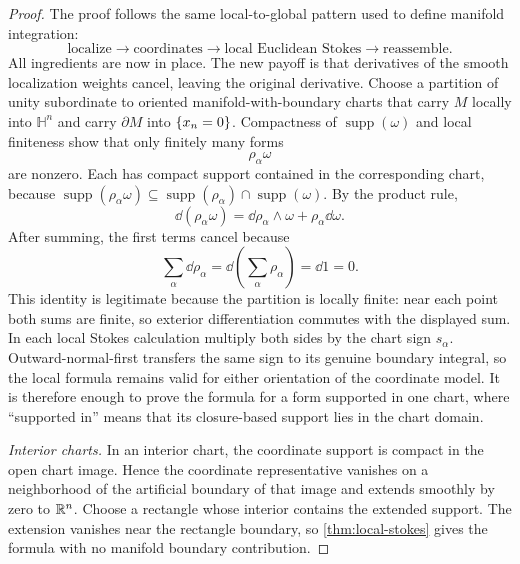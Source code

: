 \begin{proof}
The proof follows the same local-to-global pattern used to define
manifold integration:
\[
\text{localize}\to\text{coordinates}\to\text{local Euclidean Stokes}
\to\text{reassemble}.
\]
All ingredients are now in place. The new payoff is that derivatives of
the smooth localization weights cancel, leaving the original derivative.
Choose a partition of unity subordinate to oriented manifold-with-boundary
charts that carry $M$ locally into \(\mathbb H^n\) and carry
\(\partial M\) into \(\left\{x_n=0\right\}\).  Compactness of
\(\operatorname{supp}(\omega)\) and local finiteness
show that only finitely many forms
\[
\rho_\alpha\omega
\]
are nonzero.  Each has compact support contained in the corresponding chart,
because
\(\operatorname{supp}(\rho_\alpha\omega)\subseteq
\operatorname{supp}(\rho_\alpha)\cap\operatorname{supp}(\omega)\).
By the product rule,
\[
\dd(\rho_\alpha\omega)
=
\dd\rho_\alpha\wedge\omega+\rho_\alpha\dd\omega.
\]
After summing, the first terms cancel because
\[
\sum_\alpha\dd\rho_\alpha
=
\dd\left(\sum_\alpha\rho_\alpha\right)=\dd1=0.
\]
This identity is legitimate because the partition is locally finite: near
each point both sums are finite, so exterior differentiation commutes with
the displayed sum.
In each local Stokes calculation multiply both sides by the chart sign
$s_\alpha$. Outward-normal-first transfers the same sign to its genuine
boundary integral, so the local formula remains valid for either orientation
of the coordinate model. It is therefore enough to prove the formula for a form supported in one
chart, where ``supported in'' means that its closure-based support lies in the
chart domain.


\emph{Interior charts.} In an interior chart, the coordinate support is compact in the
open chart image.  Hence the coordinate representative vanishes on a
neighborhood of the artificial boundary of that image and extends smoothly by
zero to \(\mathbb{R}^n\).  Choose a rectangle whose interior contains the extended
support.  The extension vanishes near the rectangle boundary, so
\cref{thm:local-stokes} gives the formula with no manifold boundary
contribution.


\end{proof}
